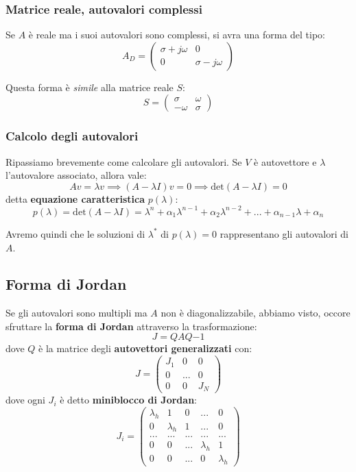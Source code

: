 \documentclass[a4paper,11pt]{article}
\begin{document}
\subsubsection{Matrice reale, autovalori complessi}
Se $A$ è reale ma i suoi autovalori sono complessi, si avra una forma del tipo:
$$
A_D = \begin{pmatrix}
	\sigma + j\omega & 0 \\
	0 & \sigma - j\omega
\end{pmatrix}
$$

Questa forma è \textit{simile} alla matrice reale $S$:
$$
S = \begin{pmatrix}
	\sigma & \omega \\
	-\omega & \sigma
\end{pmatrix}
$$

\subsubsection{Calcolo degli autovalori}
Ripassiamo brevemente come calcolare gli autovalori.
Se $V$ è autovettore e $\lambda$ l'autovalore associato, allora vale:
$$
Av = \lambda v \implies (A - \lambda I)v = 0 \implies \mathrm{det} (A - \lambda I) = 0
$$
detta \textbf{equazione caratteristica} $p(\lambda)$: 
$$
p(\lambda) = \mathrm{det} (A - \lambda I) = \lambda^n + \alpha_1 \lambda^{n - 1} + \alpha_2 \lambda^{n - 2} + ... + \alpha_{n - 1} \lambda + \alpha_n
$$

Avremo quindi che le soluzioni di $\lambda^*$ di $p(\lambda) = 0$ rappresentano gli autovalori di $A$.

\subsection{Forma di Jordan}
Se gli autovalori sono multipli ma $A$ non è diagonalizzabile, abbiamo visto, occore sfruttare la \textbf{forma di Jordan} attraverso la trasformazione:
$$
J = Q A Q{-1}
$$
dove $Q$ è la matrice degli \textbf{autovettori generalizzati} con:
$$
J = \begin{pmatrix}
	J_1 & 0 & 0 \\
	0 & ... & 0 \\
	0 & 0 & J_N
\end{pmatrix}
$$
dove ogni $J_i$ è detto \textbf{miniblocco di Jordan}:
$$
J_i = \begin{pmatrix}
	\lambda_h & 1 & 0 & ... & 0 \\ 
	0 & \lambda_h & 1 & ... & 0 \\ 
	... & ... & ... & ... & ... \\ 
	0 & 0 & ... & \lambda_h & 1 \\
	0 & 0 & ... & 0 & \lambda_h
\end{pmatrix}
$$
\end{document}
